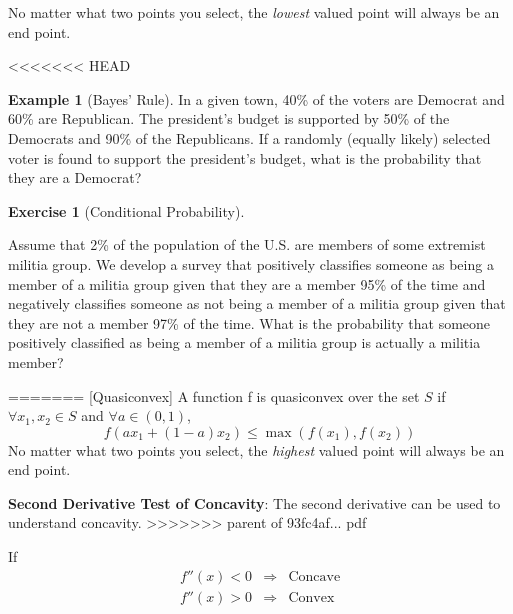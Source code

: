\documentclass[]{book}
\theoremstyle{definition}
\theoremstyle{definition}
\newtheorem{example}{Example}[chapter]
\theoremstyle{definition}
\newtheorem{exercise}{Exercise}[chapter]
\theoremstyle{remark}
\begin{document}
No matter what two points you select, the \textit{lowest} valued point will always be an end point.

<<<<<<< HEAD
\begin{example}[Bayes' Rule]
\protect\hypertarget{exm:bayesrule}{}{\label{exm:bayesrule} {} }
In a given town, 40\% of the voters are Democrat and 60\% are Republican. The president's budget is supported by 50\% of the Democrats and 90\% of the Republicans. If a randomly (equally likely) selected voter is found to support the president's budget, what is the probability that they are a Democrat?
\end{example}

\begin{exercise}[Conditional Probability]
\protect\hypertarget{exr:condprobexr}{}{\label{exr:condprobexr} {} }

Assume that 2\% of the population of the U.S. are members of some extremist militia group. We develop a survey that positively classifies someone as being a member of a militia group given that they are a member 95\% of the time and negatively classifies someone as not being a member of a militia group given that they are not a member 97\% of the time. What is the probability that someone positively classified as being a member of a militia group is actually a militia member?
\end{exercise}
=======
[Quasiconvex]
\protect\hypertarget{def:unnamed-chunk-51}{}{\label{def:unnamed-chunk-51} {} }A function f is quasiconvex over the set \(S\) if \(\forall x_1,x_2 \in S\) and \(\forall a \in (0,1)\), \[f(ax_1 + (1-a)x_2) \le \max(f(x_1),f(x_2))\]
No matter what two points you select, the \textit{highest} valued point will always be an end point.

\textbf{Second Derivative Test of Concavity}: The second derivative can be used to understand concavity.
>>>>>>> parent of 93fc4af... pdf

If
\[\begin{array}{lll}
f''(x) < 0 & \Rightarrow & \text{Concave}\\
f''(x) > 0 & \Rightarrow & \text{Convex}
\end{array}\]
\end{document}
